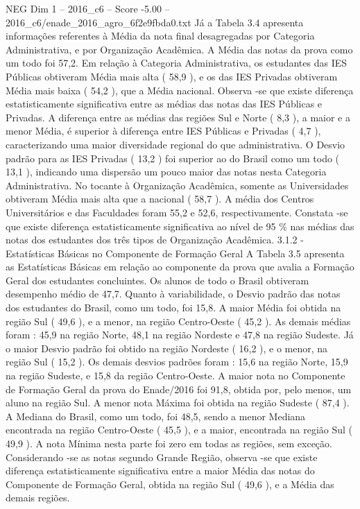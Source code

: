 \begin{textsample}{NEG Dim 1 – 2016\_c6 – Score -5.00 – 2016\_c6/enade\_2016\_agro\_6f2e9fbda0.txt}
Já a Tabela 3.4 apresenta informações referentes à Média da nota final desagregadas por Categoria Administrativa, e por Organização Acadêmica.
A Média das notas da prova como um todo foi 57,2.
Em relação à Categoria Administrativa, os estudantes das IES Públicas obtiveram Média mais alta ( 58,9 ), e os das IES Privadas obtiveram Média mais baixa ( 54,2 ), que a Média nacional.
Observa -se que existe diferença estatisticamente significativa entre as médias das notas das IES Públicas e Privadas.
A diferença entre as médias das regiões Sul e Norte ( 8,3 ), a maior e a menor Média, é superior à diferença entre IES Públicas e Privadas ( 4,7 ), caracterizando uma maior diversidade regional do que administrativa.
O Desvio padrão para as IES Privadas ( 13,2 ) foi superior ao do Brasil como um todo ( 13,1 ), indicando uma dispersão um pouco maior das notas nesta Categoria Administrativa.
No tocante à Organização Acadêmica, somente as Universidades obtiveram Média mais alta que a nacional ( 58,7 ).
A média dos Centros Universitários e das Faculdades foram 55,2 e 52,6, respectivamente.
Constata -se que existe diferença estatisticamente significativa ao nível de 95 \% nas médias das notas dos estudantes dos três tipos de Organização Acadêmica. 3.1.2 - Estatísticas Básicas no Componente de Formação Geral A Tabela 3.5 apresenta as Estatísticas Básicas em relação ao componente da prova que avalia a Formação Geral dos estudantes concluintes.
Os alunos de todo o Brasil obtiveram desempenho médio de 47,7.
Quanto à variabilidade, o Desvio padrão das notas dos estudantes do Brasil, como um todo, foi 15,8.
A maior Média foi obtida na região Sul ( 49,6 ), e a menor, na região Centro-Oeste ( 45,2 ).
As demais médias foram : 45,9 na região Norte, 48,1 na região Nordeste e 47,8 na região Sudeste.
Já o maior Desvio padrão foi obtido na região Nordeste ( 16,2 ), e o menor, na região Sul ( 15,2 ).
Os demais desvios padrões foram : 15,6 na região Norte, 15,9 na região Sudeste, e 15,8 da região Centro-Oeste.
A maior nota no Componente de Formação Geral da prova do Enade/2016 foi 91,8, obtida por, pelo menos, um aluno na região Sul.
A menor nota Máxima foi obtida na região Sudeste ( 87,4 ).
A Mediana do Brasil, como um todo, foi 48,5, sendo a menor Mediana encontrada na região Centro-Oeste ( 45,5 ), e a maior, encontrada na região Sul ( 49,9 ).
A nota Mínima nesta parte foi zero em todas as regiões, sem exceção.
Considerando -se as notas segundo Grande Região, observa -se que existe diferença estatisticamente significativa entre a maior Média das notas do Componente de Formação Geral, obtida na região Sul ( 49,6 ), e a Média das demais regiões.

\end{textsample}
